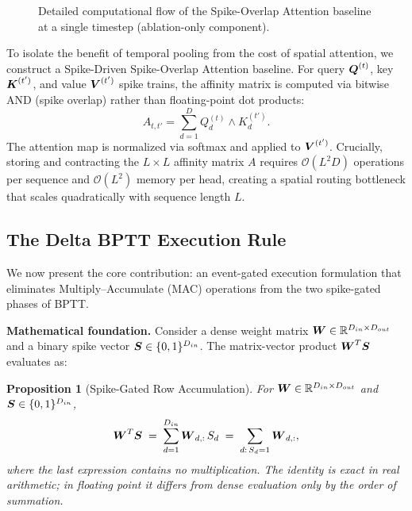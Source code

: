 \documentclass[10pt,journal,compsoc]{IEEEtran}
\newtheorem{prop}{Proposition}
\begin{document}
\begin{figure}[t!]
\begin{center}
{%
}
\end{center}
\caption{Detailed computational flow of the Spike-Overlap Attention baseline at a single timestep (ablation-only component).}
\label{fig:attention_mech}
\end{figure}
To isolate the benefit of temporal pooling from the cost of spatial attention, we construct a Spike-Driven Spike-Overlap Attention baseline. For query $\boldsymbol{Q}^{(t)}$, key $\boldsymbol{K}^{(t')}$, and value $\boldsymbol{V}^{(t')}$ spike trains, the affinity matrix is computed via bitwise AND (spike overlap) rather than floating-point dot products:
\begin{equation}
A_{t, t'} = \sum_{d=1}^{D} Q_d^{(t)} \wedge K_d^{(t')}.
\label{eq:spike_overlap}
\end{equation}
The attention map is normalized via softmax and applied to $\boldsymbol{V}^{(t')}$. Crucially, storing and contracting the $L \times L$ affinity matrix $A$ requires $\mathcal{O}(L^2 D)$ operations per sequence and $\mathcal{O}(L^2)$ memory per head, creating a spatial routing bottleneck that scales quadratically with sequence length $L$.

\subsection{The Delta BPTT Execution Rule}
We now present the core contribution: an event-gated execution formulation that eliminates Multiply--Accumulate (MAC) operations from the two spike-gated phases of BPTT.

\textbf{Mathematical foundation.} Consider a dense weight matrix $\boldsymbol{W} \in \mathbb{R}^{D_{in} \times D_{out}}$ and a binary spike vector $\boldsymbol{S} \in \{0, 1\}^{D_{in}}$. The matrix-vector product $\boldsymbol{W}^T \boldsymbol{S}$ evaluates as:
\begin{prop}[Spike-Gated Row Accumulation]
For $\boldsymbol{W} \in \mathbb{R}^{D_{in} \times D_{out}}$ and $\boldsymbol{S} \in \{0, 1\}^{D_{in}}$,
\begin{equation}
\boldsymbol{W}^T \boldsymbol{S} \;=\; \sum_{d=1}^{D_{in}} \boldsymbol{W}_{d,:}\, S_d \;=\; \sum_{d:\, S_d = 1} \boldsymbol{W}_{d,:},
\end{equation}
where the last expression contains no multiplication. The identity is exact in real arithmetic; in floating point it differs from dense evaluation only by the order of summation.
\end{prop}
\end{document}
